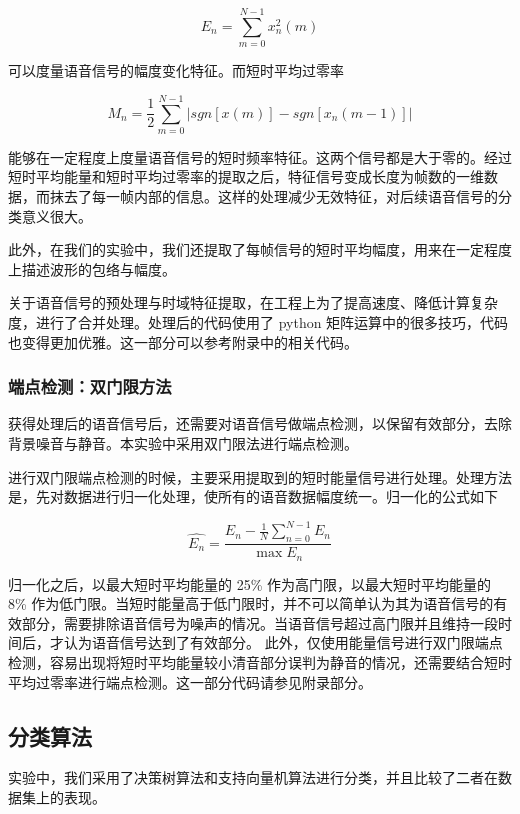 \[ E_n = \sum_{m=0}^{N-1} x_n^2(m) \]

可以度量语音信号的幅度变化特征。而短时平均过零率

\[ M_n = \frac{1}{2} \sum_{m=0}^{N-1} |sgn [x(m)] - sgn[x_n(m-1)]|\]

能够在一定程度上度量语音信号的短时频率特征。这两个信号都是大于零的。经过短时平均能量和短时平均过零率的提取之后，特征信号变成长度为帧数的一维数据，而抹去了每一帧内部的信息。这样的处理减少无效特征，对后续语音信号的分类意义很大。

此外，在我们的实验中，我们还提取了每帧信号的短时平均幅度，用来在一定程度上描述波形的包络与幅度。

关于语音信号的预处理与时域特征提取，在工程上为了提高速度、降低计算复杂度，进行了合并处理。处理后的代码使用了
python
矩阵运算中的很多技巧，代码也变得更加优雅。这一部分可以参考附录中的相关代码。

\hypertarget{ux7aefux70b9ux68c0ux6d4bux53ccux95e8ux9650ux65b9ux6cd5}{%
\subsubsection{端点检测：双门限方法}\label{ux7aefux70b9ux68c0ux6d4bux53ccux95e8ux9650ux65b9ux6cd5}}

获得处理后的语音信号后，还需要对语音信号做端点检测，以保留有效部分，去除背景噪音与静音。本实验中采用双门限法进行端点检测。

进行双门限端点检测的时候，主要采用提取到的短时能量信号进行处理。处理方法是，先对数据进行归一化处理，使所有的语音数据幅度统一。归一化的公式如下

\[ \hat{E_n} = \frac{E_n - \frac{1}{N} \sum_{n=0}^{N-1} E_n} {\max{E_n}} \]

归一化之后，以最大短时平均能量的 25\% 作为高门限，以最大短时平均能量的
8\%
作为低门限。当短时能量高于低门限时，并不可以简单认为其为语音信号的有效部分，需要排除语音信号为噪声的情况。当语音信号超过高门限并且维持一段时间后，才认为语音信号达到了有效部分。
此外，仅使用能量信号进行双门限端点检测，容易出现将短时平均能量较小清音部分误判为静音的情况，还需要结合短时平均过零率进行端点检测。这一部分代码请参见附录部分。

\hypertarget{ux5206ux7c7bux7b97ux6cd5}{%
\subsection{分类算法}\label{ux5206ux7c7bux7b97ux6cd5}}

实验中，我们采用了决策树算法和支持向量机算法进行分类，并且比较了二者在数据集上的表现。


